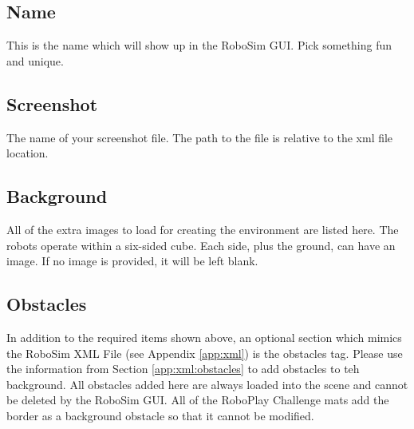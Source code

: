 \documentclass{article}
\begin{document}
\subsection{Name}
This is the name which will show up in the RoboSim GUI.  Pick something fun and
unique.

\subsection{Screenshot}
The name of your screenshot file.  The path to the file is relative to the xml
file location.

\subsection{Background}
All of the extra images to load for creating the environment are listed here.
The robots operate within a six-sided cube.  Each side, plus the ground, can
have an image.  If no image is provided, it will be left blank.

\subsection{Obstacles}
In addition to the required items shown above, an optional section which mimics
the RoboSim XML File (see Appendix \ref{app:xml}) is the obstacles tag.  Please
use the information from Section \ref{app:xml:obstacles} to add obstacles to teh
background.  All obstacles added here are always loaded into the scene and
cannot be deleted by the RoboSim GUI.  All of the RoboPlay Challenge mats add
the border as a background obstacle so that it cannot be modified.
\end{document}
